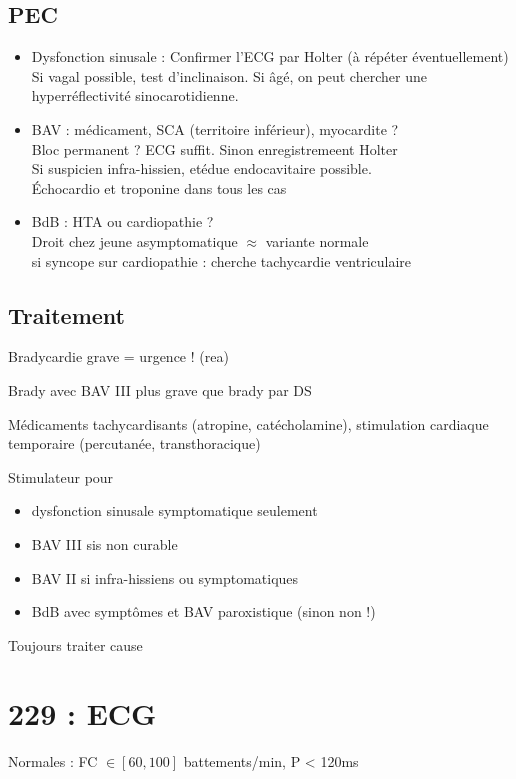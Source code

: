 \subsection{PEC}
\begin{itemize}
  \item 
Dysfonction sinusale : Confirmer l'ECG par Holter (à répéter éventuellement)
Si vagal possible, test d'inclinaison. Si âgé, on peut chercher une
hyperréflectivité sinocarotidienne.
\item BAV : médicament, SCA (territoire inférieur), myocardite ? \\
  Bloc permanent ? ECG suffit. Sinon enregistremeent Holter \\
  Si suspicien infra-hissien, etédue endocavitaire possible.\\
  Échocardio et troponine dans tous les cas
\item BdB : HTA ou cardiopathie ?\\
  Droit chez jeune asymptomatique $\approx$ variante normale\\
  si syncope sur cardiopathie : cherche tachycardie ventriculaire
\end{itemize}

\subsection{Traitement}
Bradycardie grave = urgence ! (rea) \skull

Brady avec BAV III plus grave que brady par DS

Médicaments tachycardisants (atropine, catécholamine), stimulation cardiaque
temporaire (percutanée, transthoracique)

Stimulateur pour 
\begin{itemize}
  \item dysfonction sinusale symptomatique seulement
  \item BAV III sis non curable
  \item BAV II si infra-hissiens ou symptomatiques
  \item BdB avec symptômes et BAV paroxistique (sinon non !)
\end{itemize}
Toujours traiter cause



\section{229 : ECG}%
\label{sec:229_ecg}
Normales : FC $\in [60, 100]$ battements/min, P < 120ms

